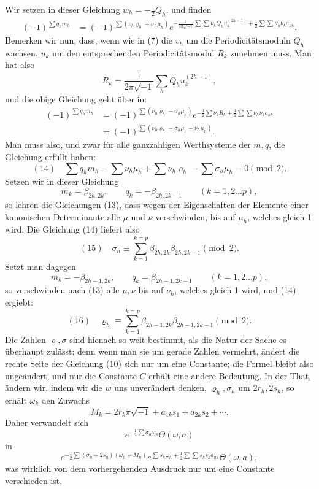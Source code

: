 \documentclass[10pt]{article}
\begin{document}
Wir setzen in dieser Gleichung \(w_h=-\frac12Q_h\), und finden
\[
\begin{aligned}
(-1)^{\sum q_hm_h}
&=(-1)^{\sum(\nu_h\varrho_h-\sigma_h\mu_h)}
e^{-\frac{1}{4\pi\sqrt{-1}}\sum\sum\nu_kQ_hu_k^{(2h-1)}
+\frac12\sum\sum\nu_h\nu_ka_{hk}}.
\end{aligned}
\]
Bemerken wir nun, dass, wenn wie in (7) die \(v_h\) um die Periodicitätsmoduln \(Q_h\) wachsen, \(u_k\) um den entsprechenden Periodicitätsmodul \(R_k\) zunehmen muss. Man hat also
\[
R_k=\frac{1}{2\pi\sqrt{-1}}\sum_h Q_hu_k^{(2h-1)},
\]
und die obige Gleichung geht über in:
\[
\begin{aligned}
(-1)^{\sum q_hm_h}
&=(-1)^{\sum(\nu_h\varrho_h-\sigma_h\mu_h)}
e^{-\frac12\sum\nu_kR_k+\frac12\sum\sum\nu_h\nu_ka_{hk}}\\
&=(-1)^{\sum(\nu_h\varrho_h-\sigma_h\mu_h-\nu_h\mu_h)}.
\end{aligned}
\]
Man muss also, und zwar für alle ganzzahligen Werthsysteme der \(m,q\), die Gleichung erfüllt haben:
\[
(14)\quad
\sum q_hm_h-\sum\nu_h\mu_h+\sum\nu_h\varrho_h-\sum\sigma_h\mu_h
\equiv0 \pmod{2}.
\]
Setzen wir in dieser Gleichung
\[
m_k=\beta_{2h,2k},\qquad q_k=-\beta_{2h,2k-1}\qquad (k=1,2\ldots p),
\]
so lehren die Gleichungen (13), dass wegen der Eigenschaften der Elemente einer kanonischen Determinante alle \(\mu\) und \(\nu\) verschwinden, bis auf \(\mu_h\), welches gleich 1 wird. Die Gleichung (14) liefert also
\[
(15)\quad
\sigma_h\equiv\sum_{k=1}^{k=p}\beta_{2h,2k}\beta_{2h,2k-1}\pmod{2}.
\]
Setzt man dagegen
\[
m_k=-\beta_{2h-1,2k},\qquad q_k=\beta_{2h-1,2k-1}\qquad (k=1,2\ldots p),
\]
so verschwinden nach (13) alle \(\mu,\nu\) bis auf \(\nu_h\), welches gleich 1 wird, und (14) ergiebt:
\[
(16)\quad
\varrho_h\equiv\sum_{k=1}^{k=p}\beta_{2h-1,2k}\beta_{2h-1,2k-1}\pmod{2}.
\]
Die Zahlen \(\varrho,\sigma\) sind hienach so weit bestimmt, als die Natur der Sache es überhaupt zulässt; denn wenn man sie um gerade Zahlen vermehrt, ändert die rechte Seite der Gleichung (10) sich nur um eine Constante; die Formel bleibt also ungeändert, und nur die Constante \(C\) erhält eine andere Bedeutung. In der That, ändern wir, indem wir die \(w\) uns unverändert denken, \(\varrho_h,\sigma_h\) um \(2r_h,2s_h\), so erhält \(\omega_k\) den Zuwachs
\[
M_k=2r_k\pi\sqrt{-1}+a_{1k}s_1+a_{2k}s_2+\cdots .
\]
Daher verwandelt sich
\[
e^{-\frac12\sum\sigma_h\omega_h}\Theta(\omega,a)
\]
in
\[
e^{-\frac12\sum(\sigma_h+2s_h)(\omega_h+M_h)}
e^{\sum s_h\omega_h+\frac12\sum\sum s_hs_ka_{hk}}\Theta(\omega,a),
\]
was wirklich von dem vorhergehenden Ausdruck nur um eine Constante verschieden ist.
\end{document}
